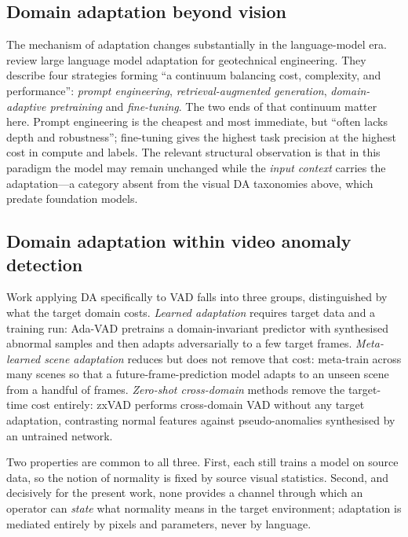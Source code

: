 \documentclass[a4paper,fleqn]{cas-sc}
\begin{document}
\subsection{Domain adaptation beyond vision}
The mechanism of adaptation changes substantially in the language-model era.
\citet{fan2026llm} review large language model adaptation for geotechnical
engineering. They describe four strategies forming ``a continuum balancing cost,
complexity, and performance'': \emph{prompt engineering},
\emph{retrieval-augmented generation}, \emph{domain-adaptive pretraining} and
\emph{fine-tuning}. The two ends of that continuum matter here. Prompt
engineering is the cheapest and most immediate, but ``often lacks depth and
robustness''; fine-tuning gives the highest task precision at the highest cost
in compute and labels.
The relevant structural observation is that in this paradigm the model may remain
unchanged while the \emph{input context} carries the adaptation---a category
absent from the visual DA taxonomies above, which predate foundation models.

\subsection{Domain adaptation within video anomaly detection}
Work applying DA specifically to VAD falls into three groups, distinguished by
what the target domain costs. \emph{Learned adaptation} requires target data and
a training run: Ada-VAD \citep{adavad2024} pretrains a domain-invariant predictor
with synthesised abnormal samples and then adapts adversarially to a few target
frames. \emph{Meta-learned scene adaptation} reduces but does not remove that
cost: \citet{lu2020fewshot} meta-train across many scenes so that a
future-frame-prediction model adapts to an unseen scene from a handful of frames.
\emph{Zero-shot cross-domain} methods remove the target-time cost entirely: zxVAD
\citep{aich2023zxvad} performs cross-domain VAD without any target adaptation,
contrasting normal features against pseudo-anomalies synthesised by an untrained
network.

Two properties are common to all three. First, each still trains a model on
source data, so the notion of normality is fixed by source visual statistics.
Second, and decisively for the present work, none provides a channel through
which an operator can \emph{state} what normality means in the target
environment; adaptation is mediated entirely by pixels and parameters, never by
language.

\end{document}
